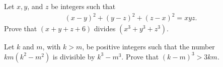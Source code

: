 \documentclass{subfile}
\begin{document}
	\begin{problem}
		Let $x, y$, and $z$ be integers such that
			\begin{align*}
				(x-y)^2+(y-z)^2+(z-x)^2 = xyz.
			\end{align*}
		Prove that $(x+y+z+6)$ divides $(x^3+y^3+z^3)$.
	\end{problem}


	\begin{problem}
		Let $k$ and $m$, with $k > m$, be positive integers such that the number $km(k^2 - m^2)$ is divisible by $k^3 - m^3$. Prove that $(k - m)^3 > 3km$. %
	\end{problem}

%
%
\end{document}
